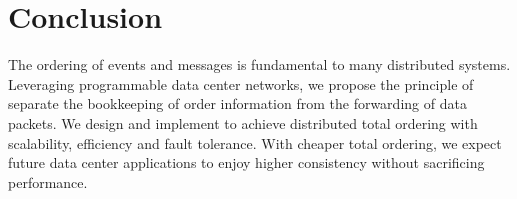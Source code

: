 \section{Conclusion}
\label{sec:conclusion}

The ordering of events and messages is fundamental to many distributed systems.
Leveraging programmable data center networks, we propose the principle of separate the bookkeeping of order information from the forwarding of data packets.
We design and implement \sys to achieve distributed total ordering with scalability, efficiency and fault tolerance.
With cheaper total ordering, we expect future data center applications to enjoy higher consistency without sacrificing performance.